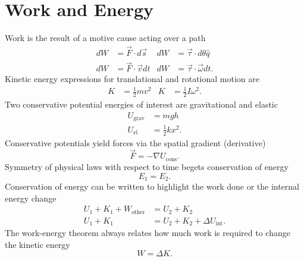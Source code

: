 \section{Work and Energy}

Work is the result of a motive cause acting over a path
\begin{align*}
  dW &= \vec{F}\cdot d\vec{s}   & dW &= \vec{\tau} \cdot d\theta \hat{q}\\
  dW &= \vec{F}\cdot \vec{v}dt   & dW &= \vec{\tau} \cdot \vec{\omega} dt.
\end{align*}
Kinetic energy expressions for translational and rotational motion are
\begin{align*}
  K &= \tfrac{1}{2}mv^2   & K &= \tfrac{1}{2}I\omega^2.
\end{align*}
Two conservative potential energies of interest are gravitational and elastic
\begin{align*}
  U_{\text{grav}} &= mgh\\
  U_{\text{el}} &= \tfrac{1}{2} k x^2.
\end{align*}
Conservative potentials yield forces via the spatial gradient (derivative)
\begin{equation*}
  \vec{F} = -\nabla U_{\text{cons}}.
\end{equation*}
Symmetry of physical laws with respect to time begets conservation of
energy
\begin{equation*}
  E_1 = E_2.
\end{equation*}
Conservation of energy can be written to highlight the work done or the
internal energy change
\begin{align*}
  U_1 + K_1 + W_{\text{other}} &= U_2 + K_2\\
  U_1 + K_1 &= U_2 + K_2 + \Delta U_{\text{int}}.
\end{align*}
The work-energy theorem always relates how much work is required to change the
kinetic energy 
\begin{equation*}
  W = \Delta K.
\end{equation*}


